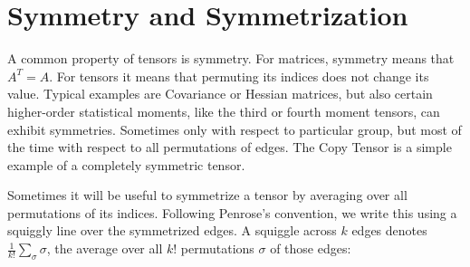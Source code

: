 \section{Symmetry and Symmetrization}
\label{sec:symmetry}

A common property of tensors is symmetry.
For matrices, symmetry means that $A^T = A$.
For tensors it means that permuting its indices does not change its value.
Typical examples are Covariance or Hessian matrices,
but also certain higher-order statistical moments, like the third or fourth moment tensors, can exhibit symmetries.
Sometimes only with respect to particular group, but most of the time with respect to all permutations of edges.
The Copy Tensor is a simple example of a completely symmetric tensor.

Sometimes it will be useful to symmetrize a tensor by averaging over all permutations of its indices.
Following Penrose's convention, we write this using a squiggly line over the symmetrized edges.
A squiggle across $k$ edges denotes $\frac{1}{k!}\sum_\sigma \sigma$, the average over all $k!$ permutations $\sigma$ of those edges:
